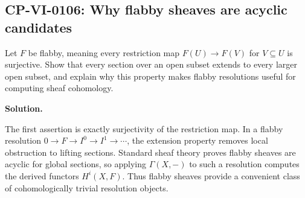 
\subsection*{CP-VI-0106: Why flabby sheaves are acyclic candidates}

Let $F$ be flabby, meaning every restriction map $F(U)\to F(V)$ for $V\subseteq U$ is surjective. Show that every section over an open subset extends to every larger open subset, and explain why this property makes flabby resolutions useful for computing sheaf cohomology.

\medskip
\noindent\textbf{Solution.}

The first assertion is exactly surjectivity of the restriction map. In a flabby resolution $0\to F\to I^0\to I^1\to\cdots$, the extension property removes local obstruction to lifting sections. Standard sheaf theory proves flabby sheaves are acyclic for global sections, so applying $\Gamma(X,-)$ to such a resolution computes the derived functors $H^i(X,F)$. Thus flabby sheaves provide a convenient class of cohomologically trivial resolution objects.
